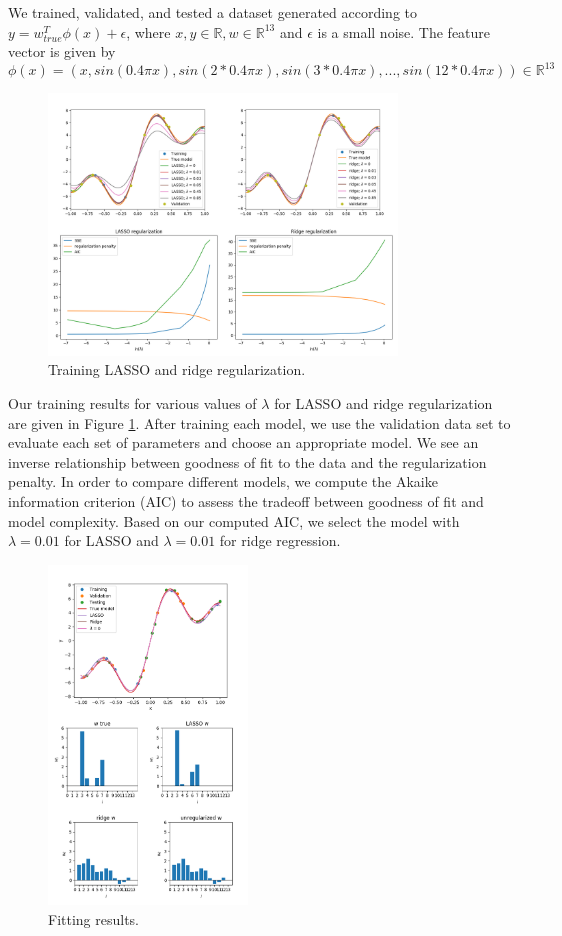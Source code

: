 \documentclass[10pt]{article}
\newcommand{\R}{\mathbb{R}}
\begin{document}
We trained, validated, and tested a dataset generated according to $y=w_{true}^T\phi(x) + \epsilon$, where $x,y \in \R, w \in \R^{13}$ and $\epsilon$ is a small noise. The feature vector is given by
$$ \phi(x) = (x, sin(0.4\pi x), sin(2*0.4\pi x), sin(3*0.4\pi x),...,sin(12*0.4\pi x)) \in \R^13$$

\begin{figure}
\caption{Training LASSO and ridge regularization.}
\begin{center}
\includegraphics[width=350px]{all_training}
\end{center}
\label{fig:train_lasso}
\end{figure}

Our training results for various values of $\lambda$ for LASSO and ridge regularization are given in Figure \ref{fig:train_lasso}. After training each model, we use the validation data set to evaluate each set of parameters and choose an appropriate model. We see an inverse relationship between goodness of fit to the data and the regularization penalty. In order to compare different models, we compute the Akaike information criterion (AIC) to assess the tradeoff between goodness of fit and model complexity. Based on our computed AIC, we select the model with $\lambda=0.01$ for LASSO and $\lambda=0.01$ for ridge regression.

\begin{figure}
\caption{Fitting results.}
\begin{center}
\includegraphics[width=200px]{final_fitting_results}
\end{center}
\label{fig:final_lasso_test}
\end{figure}
\end{document}
